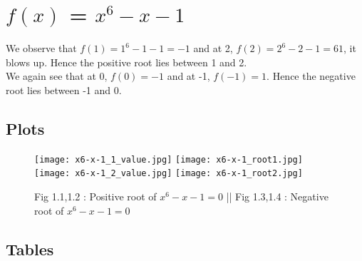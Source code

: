 \documentclass{article}
\begin{document}
\section{$f(x)$ = $x^6 - x - 1$}
We observe that $f(1) = 1^6-1-1 = -1$ and at 2, $f(2) = 2^6-2-1 = 61$, it blows up. Hence the positive root lies between 1 and 2.
\\We again see that at 0, $f(0) = -1$ and at -1, $f(-1) = 1$. Hence the negative root lies between -1 and 0.

\subsection{Plots}
\begin{figure}[!h]
    \centering
    \texttt{[image: x6-x-1\_1\_value.jpg]}
    \texttt{[image: x6-x-1\_root1.jpg]}
    \texttt{[image: x6-x-1\_2\_value.jpg]}
    \texttt{[image: x6-x-1\_root2.jpg]}
    \caption{Fig 1.1,1.2 : Positive root of $x^6 - x -1 = 0$ 
     || Fig 1.3,1.4 : Negative root of $x^6 - x -1 = 0$}
    \label{fig:ques1}
\end{figure}
\newpage
\subsection{Tables}
\end{document}
